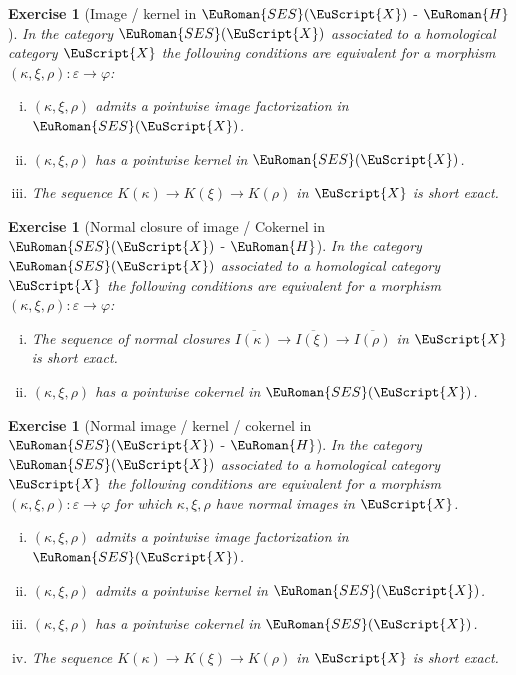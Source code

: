 \documentclass [12pt,oneside]{book}%
\theoremstyle{captionstyle}  %
\newtheorem{exercise}[theorem]{Exercise}
\newenvironment{thmlist}{		%
	\begin{enumerate}[(i)]}{
	\end{enumerate}
}
\newenvironment{exercises}{%
	\def\FrameCommand{{\color{Maroon}\vrule width 0pt}\hspace{0pt}\fboxsep=\FrameSep}%
	\MakeFramed{\hsize=0.95\linewidth\advance\hsize-\width\FrameRestore%
		\bigskip
		\textbf{Exercises}\vspace{-2ex}\footnotesize{
		}}
}
{\endMakeFramed}
\newcommand{\from}{\colon}				%
\newcommand{\Ctgry}[1]{\EuScript{#1}}					%
\newcommand{\SACtgry}[1]{\EuScript{#1}}			%
\newcommand{\SESCat}[1]{\EuRoman{SES}(\Ctgry{#1})}				%
\newcommand{\Ker}[1]{\textit{K}(#1)}		     	%
\newcommand{\Img}[1]{\textit{I}(#1)}	               %
\newcommand{\HTag}{ - {\color{Brown} $\EuRoman{H}$}}																					%
\begin{document}
\begin{exercises}
\begin{exercise}[Image / kernel in $\SESCat{X}$\HTag]
    \label{thm:Image/Kernel-In-SES(X)}
    In the category $\SESCat{X}$ associated to a homological category $\Ctgry{X}$ the following conditions are equivalent for a morphism $(\kappa,\xi,\rho)\from \varepsilon\to \varphi$:
    \begin{enumerate}[(i)]
        \item $(\kappa,\xi,\rho)$ admits a pointwise image factorization in $\SESCat{X}$.
        \item $(\kappa,\xi,\rho)$ has a pointwise kernel in $\SESCat{X}$.
        \item The sequence $\Ker{\kappa}\to \Ker{\xi}\to \Ker{\rho}$ in $\Ctgry{X}$ is short exact.
    \end{enumerate}
\end{exercise}

\begin{exercise}[Normal closure of image / Cokernel in $\SESCat{X}$\HTag]
    \label{exe:NormalClosureImage/CoKernel-In-SES(X)}
    In the category $\SESCat{X}$ associated to a homological category $\SACtgry{X}$ the following conditions are equivalent for a morphism $(\kappa,\xi,\rho)\from \varepsilon\to \varphi$:
    \begin{thmlist}
        \item The sequence of normal closures $\overline{\Img{\kappa}}\to \overline{\Img{\xi}}\to \overline{\Img{\rho}}$ in $\Ctgry{X}$ is short exact.
        \item $(\kappa,\xi,\rho)$ has a pointwise cokernel in $\SESCat{X}$.
    \end{thmlist}
\end{exercise}

\begin{exercise}[Normal image / kernel / cokernel in $\SESCat{X}$\HTag]
    \label{thm:NormalImage/Kernel/CoKernel-In-SES(X)}
    In the category $\SESCat{X}$ associated to a homological category $\Ctgry{X}$ the following conditions are equivalent for a morphism $(\kappa,\xi,\rho)\from \varepsilon\to \varphi$ for which $\kappa,\xi,\rho$ have normal images in $\Ctgry{X}$.
    \begin{thmlist}
        \item $(\kappa,\xi,\rho)$ admits a pointwise image factorization in $\SESCat{X}$.
        \item $(\kappa,\xi,\rho)$ admits a pointwise kernel in $\SESCat{X}$.
        \item $(\kappa,\xi,\rho)$ has a pointwise cokernel in $\SESCat{X}$.
        \item The sequence $\Ker{\kappa}\to \Ker{\xi}\to \Ker{\rho}$ in $\Ctgry{X}$ is short exact.
    \end{thmlist}
\end{exercise}
\end{exercises}
\end{document}
